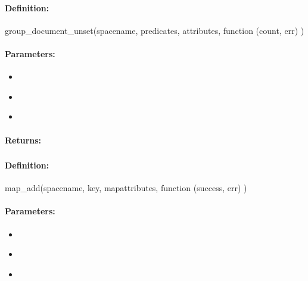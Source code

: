 \paragraph{Definition:}
\begin{javascriptcode}
group_document_unset(spacename, predicates, attributes, function (count, err) {})
\end{javascriptcode}
\paragraph{Parameters:}
\begin{itemize}[noitemsep]
\item {}\\

\item {}\\

\item {}\\

\end{itemize}

\paragraph{Returns:}


\pagebreak
\subsubsection{}
\label{api:nodejs:map_add}


\paragraph{Definition:}
\begin{javascriptcode}
map_add(spacename, key, mapattributes, function (success, err) {})
\end{javascriptcode}
\paragraph{Parameters:}
\begin{itemize}[noitemsep]
\item {}\\

\item {}\\

\item {}\\

\end{itemize}

